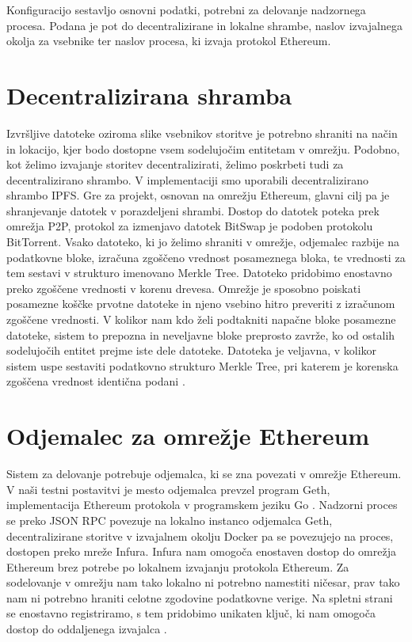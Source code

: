 \documentclass[a4paper, 12pt]{book}
\begin{document}
Konfiguracijo sestavljo osnovni podatki, potrebni za delovanje nadzornega procesa.
Podana je pot do decentralizirane in lokalne shrambe, naslov izvajalnega okolja za vsebnike ter naslov procesa, ki izvaja protokol Ethereum.

\section{Decentralizirana shramba}
Izvršljive datoteke oziroma slike vsebnikov storitve je potrebno shraniti na način in lokacijo, kjer bodo dostopne vsem sodelujočim entitetam v omrežju.
Podobno, kot želimo izvajanje storitev decentralizirati, želimo poskrbeti tudi za decentralizirano shrambo.
V implementaciji smo uporabili decentralizirano shrambo IPFS.
Gre za projekt, osnovan na omrežju Ethereum, glavni cilj pa je shranjevanje datotek v porazdeljeni shrambi.
Dostop do datotek poteka prek omrežja P2P, protokol za izmenjavo datotek BitSwap je podoben protokolu BitTorrent.
Vsako datoteko, ki jo želimo shraniti v omrežje, odjemalec razbije na podatkovne bloke, izračuna zgoščeno vrednost posameznega bloka, te vrednosti za tem sestavi v strukturo imenovano Merkle Tree.
Datoteko pridobimo enostavno preko zgoščene vrednosti v korenu drevesa.
Omrežje je sposobno poiskati posamezne koščke prvotne datoteke in njeno vsebino hitro preveriti z izračunom zgoščene vrednosti. 
V kolikor nam kdo želi podtakniti napačne bloke posamezne datoteke, sistem to prepozna in neveljavne bloke preprosto zavrže, ko od ostalih sodelujočih entitet prejme iste dele datoteke. Datoteka je veljavna, v kolikor sistem uspe sestaviti podatkovno strukturo Merkle Tree, pri katerem je korenska zgoščena vrednost identična podani \cite{Ipfs}.

\section{Odjemalec za omrežje Ethereum}
Sistem za delovanje potrebuje odjemalca, ki se zna povezati v omrežje Ethereum.
V naši testni postavitvi je mesto odjemalca prevzel program Geth, implementacija Ethereum protokola v programskem jeziku Go \cite{Geth}.
Nadzorni proces se preko JSON RPC povezuje na lokalno instanco odjemalca Geth, decentralizirane storitve v izvajalnem okolju Docker pa se 
povezujejo na proces, dostopen preko mreže Infura.
Infura nam omogoča enostaven dostop do omrežja Ethereum brez potrebe po lokalnem izvajanju protokola Ethereum.
Za sodelovanje v omrežju nam tako lokalno ni potrebno namestiti ničesar, prav tako nam ni potrebno hraniti
celotne zgodovine podatkovne verige. 
Na spletni strani se enostavno registriramo, s tem pridobimo unikaten ključ, ki nam omogoča dostop do oddaljenega izvajalca \cite{Infura}.
\end{document}

